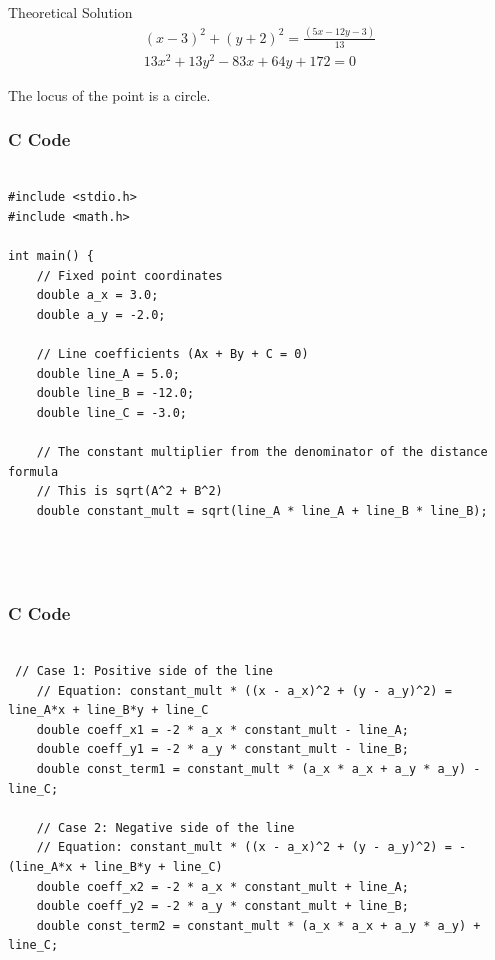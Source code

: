\documentclass{beamer}
\begin{document}
\begin{frame}{Theoretical Solution}
\begin{align}
     (x-3)^{2}+(y+2)^{2}= \frac{(5x - 12y - 3)}{13}\\
13x^2 + 13y^2 - 83x + 64y + 172 = 0
\end{align}


The locus of the point is a circle.

\end{frame}

\begin{frame}[fragile]
    \frametitle{C Code }
    \begin{lstlisting}

#include <stdio.h>
#include <math.h>

int main() {
    // Fixed point coordinates
    double a_x = 3.0;
    double a_y = -2.0;

    // Line coefficients (Ax + By + C = 0)
    double line_A = 5.0;
    double line_B = -12.0;
    double line_C = -3.0;

    // The constant multiplier from the denominator of the distance formula
    // This is sqrt(A^2 + B^2)
    double constant_mult = sqrt(line_A * line_A + line_B * line_B);

   


        \end{lstlisting}
\end{frame}

\begin{frame}[fragile]
    \frametitle{C Code }
    \begin{lstlisting}

 // Case 1: Positive side of the line
    // Equation: constant_mult * ((x - a_x)^2 + (y - a_y)^2) = line_A*x + line_B*y + line_C
    double coeff_x1 = -2 * a_x * constant_mult - line_A;
    double coeff_y1 = -2 * a_y * constant_mult - line_B;
    double const_term1 = constant_mult * (a_x * a_x + a_y * a_y) - line_C;

    // Case 2: Negative side of the line
    // Equation: constant_mult * ((x - a_x)^2 + (y - a_y)^2) = -(line_A*x + line_B*y + line_C)
    double coeff_x2 = -2 * a_x * constant_mult + line_A;
    double coeff_y2 = -2 * a_y * constant_mult + line_B;
    double const_term2 = constant_mult * (a_x * a_x + a_y * a_y) + line_C;

   
  
        \end{lstlisting}
\end{frame}
\end{document}
